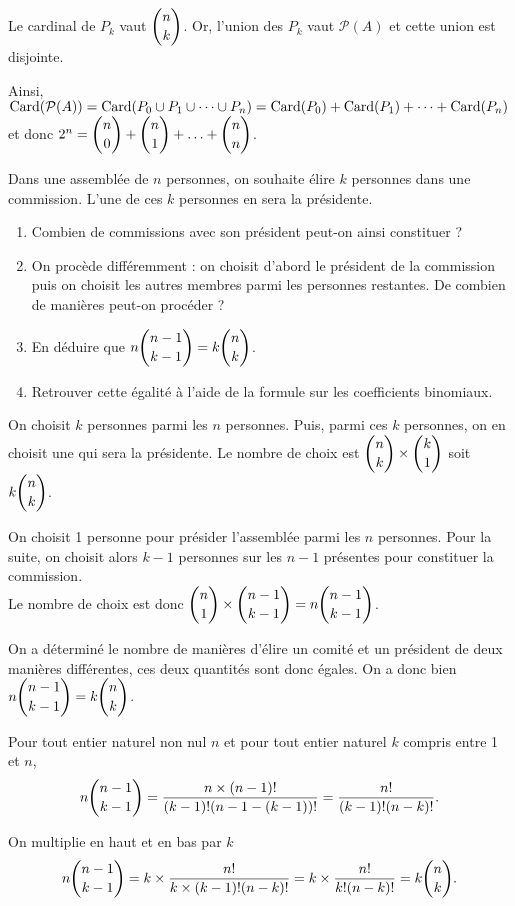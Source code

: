 \documentclass[11pt,fleqn, openany]{book} %
\begin{document}
\begin{solution}Le cardinal de $P_k$ vaut $\dbinom{n}{k}$. Or, l'union des $P_k$ vaut $\mathcal{P}(A)$ et cette union est disjointe.

Ainsi, $\mathrm{Card}(\mathcal{P}(A))=\mathrm{Card}(P_0 \cup P_1 \cup \dots \cup P_n)=\mathrm{Card}(P_0)+\mathrm{Card}(P_1) + \dots + \mathrm{Card}(P_n)$ et donc $2^n = \dbinom{n}{0} + \dbinom{n}{1} + \ldots + \dbinom{n}{n}$.\end{solution}




\begin{exercise}Dans une assemblée de $n$ personnes, on souhaite élire $k$ personnes dans une commission. L'une de ces $k$ personnes en sera la présidente.
\begin{enumerate}
\item Combien de commissions avec son président peut-on ainsi constituer ?
\item On procède différemment : on choisit d'abord le président de la commission puis on choisit les autres membres parmi les personnes restantes. De combien de manières peut-on procéder ?
\item En déduire que $n \dbinom{n-1}{k-1} = k \dbinom{n}{k}$.
\item Retrouver cette égalité à l'aide de la formule sur les coefficients binomiaux.\end{enumerate} \end{exercise}

\begin{solution}On choisit $k$ personnes parmi les $n$ personnes. Puis, parmi ces $k$ personnes, on en choisit une qui sera la présidente. Le nombre de choix est $\dbinom{n}{k} \times \dbinom{k}{1}$ soit $k \dbinom{n}{k}$.

 On choisit 1 personne pour présider l'assemblée parmi les $n$ personnes. Pour la suite, on choisit alors $k-1$ personnes sur les $n-1$ présentes pour constituer la commission.\\ Le nombre de choix est donc $\dbinom{n}{1} \times \dbinom{n-1}{k-1}=n \dbinom{n-1}{k-1}$.
 
 On a déterminé le nombre de manières d'élire un comité et un président de deux manières différentes, ces deux quantités sont donc égales. On a donc bien $ n \dbinom{n-1}{k-1} = k \dbinom{n}{k}$.
 
 Pour tout entier naturel non nul $n$ et pour tout entier naturel $k$ compris entre 1 et $n$,
\[ n \dbinom{n-1}{k-1} = \dfrac{n \times (n-1)!}{(k-1)!(n-1-(k-1))!}=\dfrac{n!}{(k-1)!(n-k)!}.\]

On multiplie en haut et en bas par $k$
\[  n \dbinom{n-1}{k-1}=k\times \dfrac{n!}{k\times (k-1)!(n-k)!}=k\times \dfrac{n!}{k!(n-k)!}= k \dbinom{n}{k} .\]\end{solution}
\end{document}
